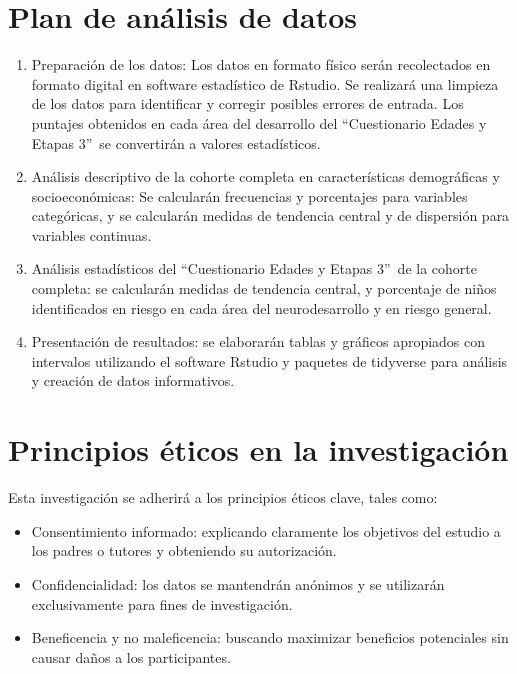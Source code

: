 \documentclass[11pt,letterpaper]{report}
\newcommand{\asq}{“Cuestionario Edades y Etapas 3”}
\begin{document}
\section{Plan de análisis de datos}
\begin{enumerate}
	\item Preparación de los datos: Los datos en formato físico serán
	recolectados en formato digital en software estadístico de Rstudio. Se
	realizará una limpieza de los datos para identificar y corregir posibles
	errores de entrada. Los puntajes obtenidos en cada área del desarrollo del 
	\asq\ se convertirán a valores estadísticos. 
	
	\item Análisis descriptivo de la cohorte completa en características
	demográficas y socioeconómicas: Se calcularán frecuencias y porcentajes
	para variables categóricas, y se calcularán medidas de tendencia central y
	de dispersión para variables continuas.

	\item Análisis estadísticos del \asq\ de la cohorte completa: se calcularán
	medidas de tendencia central, y porcentaje de niños identificados en riesgo
	en cada área del neurodesarrollo y en riesgo general.

	\item Presentación de resultados: se elaborarán tablas y gráficos
	apropiados con intervalos utilizando el software Rstudio y paquetes de
	tidyverse para análisis y creación de datos informativos.
\end{enumerate}

\section{Principios éticos en la investigación}
Esta investigación se adherirá a los principios éticos clave, tales como:
\begin{itemize}
	\item Consentimiento informado: explicando claramente los objetivos del
	estudio a los padres o tutores y obteniendo su autorización.

	\item Confidencialidad: los datos se mantendrán anónimos y se utilizarán 
	exclusivamente para fines de investigación.

	\item Beneficencia y no maleficencia: buscando maximizar beneficios
	potenciales sin causar daños a los participantes.
\end{itemize}
\end{document}
